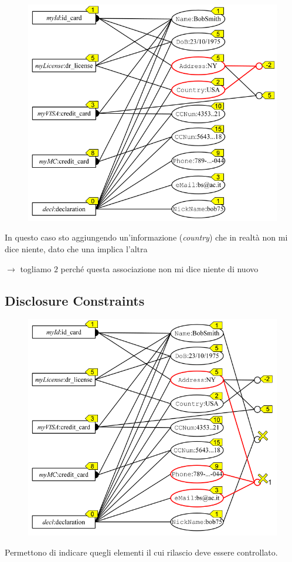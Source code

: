 \documentclass{report}
\begin{document}
\newpage
\begin{figure}[ht]
    \centering
    \includegraphics[width=1\linewidth]{images/sens-ass-2.png}
\end{figure}
In questo caso sto aggiungendo un'informazione (\textit{country}) che in realtà non mi 
dice niente, dato che una implica l'altra

$\rightarrow $ togliamo $2$ perché questa associazione non mi dice niente di nuovo

\newpage
\subsection{Disclosure Constraints}
\begin{figure}[ht]
    \centering
    \includegraphics[width=1\linewidth]{images/disclosure-constraints.png}
\end{figure}
Permettono di indicare quegli elementi il cui rilascio deve essere controllato.
\end{document}
